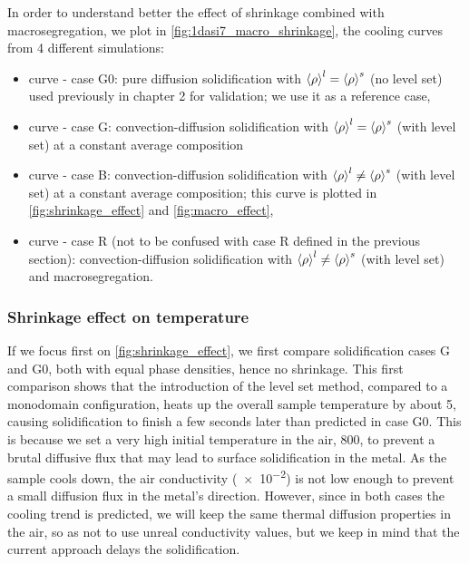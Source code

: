 In order to understand better the effect of shrinkage combined with macrosegregation, we plot in \cref{fig:1dasi7_macro_shrinkage},
the cooling curves from 4 different simulations: 
\begin{itemize}
\itemsep0em
\item {} curve - case G0: pure diffusion solidification with $\left \langle \rho \right \rangle^l=\left \langle \rho \right \rangle^s$ (no level set) used previously in chapter 2 for validation;
we use it as a reference case,
\item {} curve - case G: convection-diffusion solidification with $\left \langle \rho \right \rangle^l=\left \langle \rho \right \rangle^s$ (with level set) at a constant average composition
\item {} curve - case B: convection-diffusion solidification with $\left \langle \rho \right \rangle^l \neq \left \langle \rho \right \rangle^s$ (with level set) at a constant average composition; this curve is plotted in 
\cref{fig:shrinkage_effect} and \cref{fig:macro_effect},
\item {} curve - case R (not to be confused with case R defined in the previous section): 
convection-diffusion solidification with $\left \langle \rho \right \rangle^l \neq \left \langle \rho \right \rangle^s$ (with level set) and macrosegregation.
\end{itemize}

\subsubsection{Shrinkage effect on temperature}
If we focus first on \cref{fig:shrinkage_effect}, we first compare solidification cases G and G0, both with equal phase densities, hence no shrinkage.
This first comparison shows that the introduction of the level set method, compared to a monodomain configuration, heats up
the overall sample temperature by about \SI{5}{\udegC}, causing solidification to finish a few seconds later than predicted in case G0.
This is because we set a very high initial temperature in the air, \SI{800}{\udegC}, to prevent a brutal diffusive flux that may lead to surface solidification
in the metal. As the sample cools down, the air conductivity (\SI{e-2}{\uconductivity}) is not low enough to prevent a small diffusion flux in the metal's direction.
However, since in both cases the cooling trend is predicted, we will keep the same thermal diffusion properties in the air, so as not to use unreal conductivity values,
but we keep in mind that the current approach delays the solidification.

